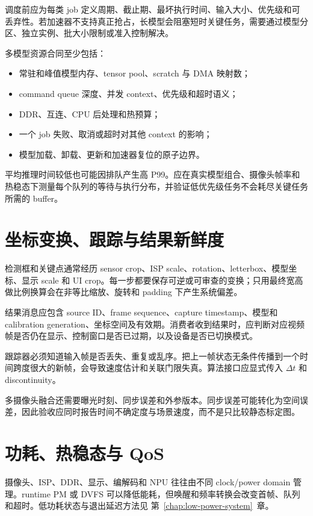 调度前应为每类 job 定义周期、截止期、最坏执行时间、输入大小、优先级和可丢弃性。若加速器不支持真正抢占，长模型会阻塞短时关键任务，需要通过模型分区、独立实例、批大小限制或准入控制解决。

多模型资源合同至少包括：

\begin{itemize}
  \item 常驻和峰值模型内存、tensor pool、scratch 与 DMA 映射数；
  \item command queue 深度、并发 context、优先级和超时语义；
  \item DDR、互连、CPU 后处理和热预算；
  \item 一个 job 失败、取消或超时对其他 context 的影响；
  \item 模型加载、卸载、更新和加速器复位的原子边界。
\end{itemize}

平均推理时间较低也可能因排队产生高 P99。应在真实模型组合、摄像头帧率和热稳态下测量每个队列的等待与执行分布，并验证低优先级任务不会耗尽关键任务所需的 buffer。

\section{坐标变换、跟踪与结果新鲜度}

检测框和关键点通常经历 sensor crop、ISP scale、rotation、letterbox、模型坐标、显示 scale 和 UI crop。每一步都要保存可逆或可审查的变换；只用最终宽高做比例换算会在非等比缩放、旋转和 padding 下产生系统偏差。

结果消息应包含 source ID、frame sequence、capture timestamp、模型和 calibration generation、坐标空间及有效期。消费者收到结果时，应判断对应视频帧是否仍在显示、控制窗口是否已过期，以及设备是否已切换模式。

跟踪器必须知道输入帧是否丢失、重复或乱序。把上一帧状态无条件传播到一个时间跨度很大的新帧，会导致速度估计和关联门限失真。算法接口应显式传入 $\Delta t$ 和 discontinuity。

多摄像头融合还需要曝光时刻、同步误差和外参版本。同步误差可能转化为空间误差，因此验收应同时报告时间不确定度与场景速度，而不是只比较静态标定图。

\section{功耗、热稳态与 QoS}

摄像头、ISP、DDR、显示、编解码和 NPU 往往由不同 clock/power domain 管理。runtime PM 或 DVFS 可以降低能耗，但唤醒和频率转换会改变首帧、队列和超时。低功耗状态与退出延迟方法见 \mbox{第~\ref{chap:low-power-system}~章}。

